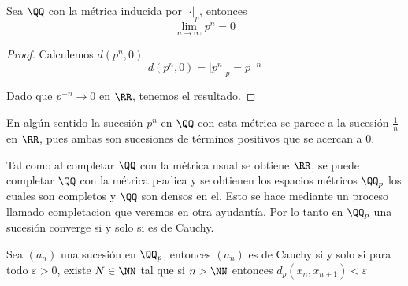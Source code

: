 \documentclass[a4paper,oneside,10.5pt]{USMArt}
\begin{document}
\begin{prop}
  Sea $\QQ$ con la métrica inducida por $|\cdot|_{p}$, entonces
  \begin{equation*}
    \lim_{n \to \infty} p^{n} = 0
  \end{equation*}
\end{prop}

\begin{proof}
  Calculemos $d(p^{n}, 0)$
  \begin{equation*}
    d(p^{n}, 0) = |p^{n}|_{p} = p^{-n}
  \end{equation*}

  Dado que $p^{-n} \to 0$ en $\RR$, tenemos el resultado.
\end{proof}
\begin{obs}
  En algún sentido la sucesión $p^{n}$ en $\QQ$ con esta métrica se parece a la sucesión $\frac{1}{n}$ en $\RR$,
  pues ambas son sucesiones de términos positivos que se acercan a $0$.
\end{obs}

\begin{obs}
  Tal como al completar $\QQ$ con la métrica usual se obtiene $\RR$, se puede completar $\QQ$ con la métrica p-adica y
  se obtienen los espacios métricos $\QQ_{p}$ los cuales son completos y $\QQ$ son densos en el. Esto se
  hace mediante un proceso llamado completacion que veremos en otra ayudantía. Por lo tanto en $\QQ_{p}$ una sucesión
  converge si y solo si es de Cauchy.
\end{obs}

\begin{prop}
  Sea $(a_{n})$ una sucesión en $\QQ_{p}$, entonces $(a_{n})$ es de Cauchy si y solo si para todo $\varepsilon > 0$,
  existe $N \in \NN$ tal que si $n > \NN$ entonces $d_{p}(x_{n}, x_{n + 1}) < \varepsilon$
\end{prop}
\end{document}
